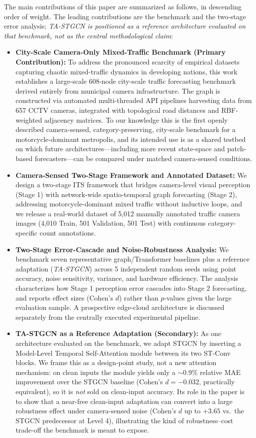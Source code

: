 \documentclass[journal,twocolumn]{IEEEtran}
\begin{document}
The main contributions of this paper are summarized as follows, in descending order of weight. The leading contributions are the benchmark and the two-stage error analysis; \emph{TA-STGCN is positioned as a reference architecture evaluated on that benchmark, not as the central methodological claim}:
\begin{itemize}
    \item \textbf{City-Scale Camera-Only Mixed-Traffic Benchmark (Primary Contribution):} To address the pronounced scarcity of empirical datasets capturing chaotic mixed-traffic dynamics in developing nations, this work establishes a large-scale 608-node city-scale traffic forecasting benchmark derived entirely from municipal camera infrastructure. The graph is constructed via automated multi-threaded API pipelines harvesting data from 657 CCTV cameras, integrated with topological road distances and RBF-weighted adjacency matrices. To our knowledge this is the first openly described camera-sensed, category-preserving, city-scale benchmark for a motorcycle-dominant metropolis, and its intended use is as a shared testbed on which future architectures---including more recent state-space and patch-based forecasters---can be compared under matched camera-sensed conditions.
    \item \textbf{Camera-Sensed Two-Stage Framework and Annotated Dataset:} We design a two-stage ITS framework that bridges camera-level visual perception (Stage 1) with network-wide spatio-temporal graph forecasting (Stage 2), addressing motorcycle-dominant mixed traffic without inductive loops, and we release a real-world dataset of 5,012 manually annotated traffic camera images (4,010 Train, 501 Validation, 501 Test) with continuous category-specific count annotations.
    \item \textbf{Two-Stage Error-Cascade and Noise-Robustness Analysis:} We benchmark seven representative graph/Transformer baselines plus a reference adaptation (\emph{TA-STGCN}) across 5 independent random seeds using point accuracy, noise sensitivity, variance, and hardware efficiency. The analysis characterizes how Stage 1 perception error cascades into Stage 2 forecasting, and reports effect sizes (Cohen's $d$) rather than $p$-values given the large evaluation sample. A prospective edge-cloud architecture is discussed separately from the centrally executed experimental pipeline.
    \item \textbf{TA-STGCN as a Reference Adaptation (Secondary):} As one architecture evaluated on the benchmark, we adapt STGCN \cite{stgcn} by inserting a Model-Level Temporal Self-Attention module \cite{attention} between its two ST-Conv blocks. We frame this as a design-point study, not a new attention mechanism: on clean inputs the module yields only a $\sim$0.9\% relative MAE improvement over the STGCN baseline (Cohen's $d = -0.032$, practically equivalent), so it is \emph{not} sold on clean-input accuracy. Its role in the paper is to show that a near-free clean-input adaptation can convert into a large robustness effect under camera-sensed noise (Cohen's $d$ up to $+3.65$ vs.\ the STGCN predecessor at Level 4), illustrating the kind of robustness--cost trade-off the benchmark is meant to expose.
\end{itemize}
\end{document}
